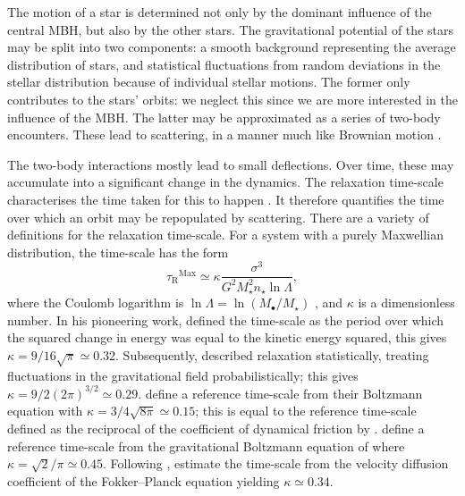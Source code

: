 \documentclass[useAMS,usedcolumn,usegraphicx,usenatbib]{mn2e}
\newcommand{\sub}[1]{\ensuremath{_\mathrm{#1}}}
\newcommand{\super}[1]{\ensuremath{^\mathrm{#1}}}
\begin{document}
The motion of a star is determined not only by the dominant influence of the central MBH, but also by the other stars. The gravitational potential of the stars may be split into two components: a smooth background representing the average distribution of stars, and statistical fluctuations from random deviations in the stellar distribution because of individual stellar motions. The former only contributes to the stars' orbits: we neglect this since we are more interested in the influence of the MBH. The latter may be approximated as a series of two-body encounters. These lead to scattering, in a manner much like Brownian motion \citep{Bekenstein1992,Maoz1993,Nelson1999}.

The two-body interactions mostly lead to small deflections. Over time, these may accumulate into a significant change in the dynamics. The relaxation time-scale characterises the time taken for this to happen \citep[section 1.2.1]{Binney2008}. It therefore quantifies the time over which an orbit may be repopulated by scattering. There are a variety of definitions for the relaxation time-scale. For a system with a purely Maxwellian distribution, the time-scale has the form
\begin{equation}
\tau\sub{R}\super{Max} \simeq \kappa\frac{\sigma^3}{G^2M_\star^2 n_\star\ln\Lambda},
\label{eq:tauMaxwell}
\end{equation}
where the Coulomb logarithm is $\ln\Lambda = \ln(M_\bullet/M_\star)$ \citep{Bahcall1976}, and $\kappa$ is a dimensionless number. In his pioneering work, \citet{Chandrasekhar1941, Chandrasekhar1960} defined the time-scale as the period over which the squared change in energy was equal to the kinetic energy squared, this gives $\kappa = 9/16\sqrt{\pi} \simeq 0.32$. Subsequently, \citet{Chandrasekhar1941a} described relaxation statistically, treating fluctuations in the gravitational field probabilistically; this gives $\kappa = 9/2(2\pi)^{3/2} \simeq 0.29$. \citet{Bahcall1977} define a reference time-scale from their Boltzmann equation with $\kappa = 3/4\sqrt{8\pi} \simeq 0.15$; this is equal to the reference time-scale defined as the reciprocal of the coefficient of dynamical friction by \citet{Chandrasekhar1943a, Chandrasekhar1943}. \citet{Spitzer1958} define a reference time-scale from the gravitational Boltzmann equation of \citet{Spitzer1951} where $\kappa = \sqrt{2}/\pi \simeq 0.45$. Following \citet{Spitzer1971}, \citet[section 7.4.5]{Binney2008} estimate the time-scale from the velocity diffusion coefficient of the Fokker--Planck equation yielding $\kappa \simeq 0.34$.
\end{document}
